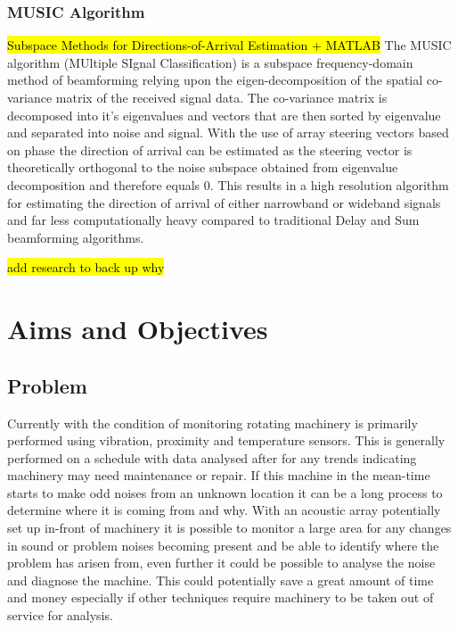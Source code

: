 \documentclass{UoNMCHA}
\numberwithin{equation}{section}
\begin{document}
\subsubsection{MUSIC Algorithm} \label{sec:Intro MUSIC}
    \hl{Subspace Methods for Directions-of-Arrival Estimation + MATLAB} The MUSIC algorithm (MUltiple SIgnal Classification) is a subspace frequency-domain method of beamforming relying upon the eigen-decomposition of the spatial co-variance matrix of the received signal data. The co-variance matrix is decomposed into it's eigenvalues and vectors that are then sorted by eigenvalue and separated into noise and signal.
    With the use of array steering vectors based on phase the direction of arrival can be estimated as the steering vector is theoretically orthogonal to the noise subspace obtained from eigenvalue decomposition and therefore equals 0. This results in a high resolution algorithm for estimating the direction of arrival of either narrowband or wideband signals and far less computationally heavy compared to traditional Delay and Sum beamforming algorithms.
    
    \hl{add research to back up why}
    
\newpage
\section{Aims and Objectives} \label{sec:Aims and Objectives}
\subsection{Problem} \label{sec:Problem}
    Currently with the condition of monitoring rotating machinery is primarily performed using vibration, proximity and temperature sensors. This is generally performed on a schedule with data analysed after for any trends indicating machinery may need maintenance or repair. If this machine in the mean-time starts to make odd noises from an unknown location it can be a long process to determine where it is coming from and why. With an acoustic array potentially set up in-front of machinery it is possible to monitor a large area for any changes in sound or problem noises becoming present and be able to identify where the problem has arisen from, even further it could be possible to analyse the noise and diagnose the machine. This could potentially save a great amount of time and money especially if other techniques require machinery to be taken out of service for analysis.
\end{document}
